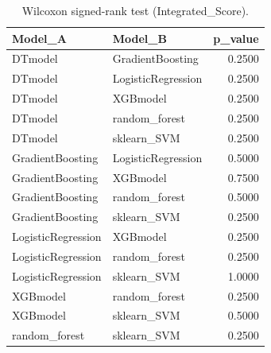 \begin{table}[t]
\centering
\begin{tabular}{llr}
\toprule
Model_A & Model_B & p_value \\
\midrule
DTmodel & GradientBoosting & 0.2500 \\
DTmodel & LogisticRegression & 0.2500 \\
DTmodel & XGBmodel & 0.2500 \\
DTmodel & random_forest & 0.2500 \\
DTmodel & sklearn_SVM & 0.2500 \\
GradientBoosting & LogisticRegression & 0.5000 \\
GradientBoosting & XGBmodel & 0.7500 \\
GradientBoosting & random_forest & 0.5000 \\
GradientBoosting & sklearn_SVM & 0.2500 \\
LogisticRegression & XGBmodel & 0.2500 \\
LogisticRegression & random_forest & 0.2500 \\
LogisticRegression & sklearn_SVM & 1.0000 \\
XGBmodel & random_forest & 0.2500 \\
XGBmodel & sklearn_SVM & 0.5000 \\
random_forest & sklearn_SVM & 0.2500 \\
\bottomrule
\end{tabular}
\caption{Wilcoxon signed-rank test (Integrated_Score).}
\label{tab:wilcoxon_Integrated_Score}
\end{table}